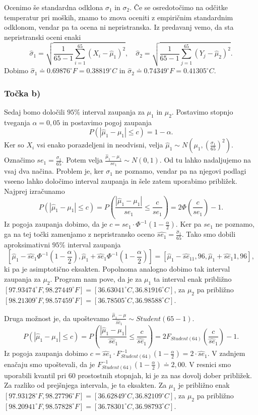 \documentclass[12pt, letterpaper]{article}
\begin{document}
Ocenimo še standardna odklona $\sigma_1$ in $\sigma_2$. Če se osredotočimo na odčitke temperatur pri moških, znamo to znova oceniti z empiričnim standardnim odklonom, vendar pa ta ocena ni nepristranska. Iz predavanj vemo, da sta nepristranski oceni enaki
\[
\hat{\sigma}_1 = \sqrt{\frac{1}{65-1}\sum_{i=1}^{65}(X_i - \hat{\mu}_1)^2}, \quad \hat{\sigma}_2 = \sqrt{\frac{1}{65-1}\sum_{j=1}^{65}(Y_j - \hat{\mu}_2)^2}.
\]
Dobimo $\hat{\sigma}_1 \doteq 0.69876^{\circ}F = 0.38819^{\circ}C$ in $\hat{\sigma}_2 \doteq 0.74349^{\circ}F = 0.41305^{\circ}C$.
\subsubsection*{Točka b)} Sedaj bomo določili $95\%$ interval zaupanja za $\mu_1$ in $\mu_2$. Postavimo stopnjo tveganja $\alpha = 0,05$ in postavimo pogoj zaupanja
\[
P(|\hat{\mu}_1 - \mu_1| \leq c) = 1 - \alpha.
\]
Ker so $X_i$ vsi enako porazdeljeni in neodvisni, velja $\hat{\mu}_1 \sim N(\mu_1, (\frac{\sigma_1}{65})^2)$. Označimo $se_1 = \frac{\sigma_1}{65}$. Potem velja $\frac{\hat{\mu}_1 - \mu_1}{se_1} \sim N(0,1)$. Od tu lahko nadaljujemo na vsaj dva načina. Problem je, ker $\sigma_1$ ne poznamo, vendar pa na njegovi podlagi vseeno lahko določimo interval zaupanja in šele zatem uporabimo približek. Najprej izračunamo
\[
P(|\hat{\mu}_1 - \mu_1| \leq c) = P\left(\frac{|\hat{\mu}_1 - \mu_1|}{se_1} \leq \frac{c}{se_1}\right) = 2\Phi\left(\frac{c}{se_1}\right) - 1.
\]
Iz pogoja zaupanja dobimo, da je $c = se_1\cdot\Phi^{-1}(1 - \frac{\alpha}{2})$. Ker pa $se_1$ ne poznamo, ga na tej točki zamenjamo z nepristransko oceno $\hat{se_1} = \frac{\hat{\sigma}_1}{65}$.
Tako smo dobili aproksimativni $95\%$ interval zaupanja
\[\left[\hat{\mu}_1 - \hat{se}_1\Phi^{-1}\left(1 - \frac{\alpha}{2}\right),  \hat{\mu}_1 + \hat{se}_1\Phi^{-1}\left(1 - \frac{\alpha}{2}\right)\right] = \left[\hat{\mu}_1 - \hat{se}_11,96,  \hat{\mu}_1 + \hat{se}_1 1,96\right],\]
ki pa je asimptotično eksakten. Popolnoma analogno dobimo tak interval zaupanja za $\mu_2$. Program nam pove, da je za $\mu_1$ ta interval enak približno $[97.93474^{\circ}F, 98.27449^{\circ}F] = [36.63041^{\circ}C, 36.81916^{\circ}C]$, za $\mu_2$ pa približno $[98.21309^{\circ}F, 98.57459^{\circ}F] = [36.78505^{\circ}C, 36.98588^{\circ}C]$.

Druga možnost je, da upoštevamo $\frac{\hat{\mu}_1 - \mu}{\hat{se}_1} \sim Student(65-1)$.
\[
P(|\hat{\mu}_1 - \mu_1| \leq c) = P\left(\frac{|\hat{\mu}_1 - \mu_1|}{\hat{se}_1} \leq \frac{c}{\hat{se}_1}\right) = 2F_{Student(64)}\left(\frac{c}{\hat{se}_1}\right) - 1.
\]
Iz pogoja zaupanja dobimo $c = \hat{se}_1\cdot F^{-1}_{Student(64)}(1 - \frac{\alpha}{2}) = 2 \cdot\hat{se}_1$. V zadnjem enačaju smo upoštevali, da je $F^{-1}_{Student(64)}(1 - \frac{\alpha}{2}) \doteq 2,00$. V resnici smo uporabili kvantil pri $60$ prostostnih stopnjah, ki je za nas dovolj dober približek. Za razliko od prejšnjega intervala, je ta eksakten. Za $\mu_1$ je približno enak $[97.93128^{\circ}F, 98.27796^{\circ}F] = [36.62849^{\circ}C, 36.82109^{\circ}C]$, za $\mu_2$ pa približno $[98.20941^{\circ}F, 98.57828^{\circ}F] =[36.78301^{\circ}C, 36.98793^{\circ}C]$.
\end{document}
